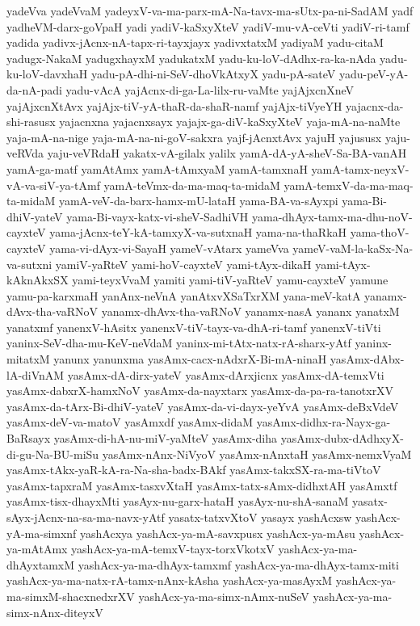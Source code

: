 {yadeVva
yadeVvaM
yadeyxV-va-ma-parx-mA-Na-tavx-ma-sUtx-pa-ni-SadAM
yadf
yadheVM-darx-goVpaH
yadi
yadiV-kaSxyXteV
yadiV-mu-vA-ceVti
yadiV-ri-tamf
yadida
yadivx-jAcnx-nA-tapx-ri-tayxjayx
yadivxtatxM
yadiyaM
yadu-citaM
yadugx-NakaM
yadugxhayxM
yadukatxM
yadu-ku-loV-dAdhx-ra-ka-nAda
yadu-ku-loV-davxhaH
yadu-pA-dhi-ni-SeV-dhoVkAtxyX
yadu-pA-sateV
yadu-peV-yA-da-nA-padi
yadu-vAcA
yajAcnx-di-ga-La-lilx-ru-vaMte
yajAjxcnXneV
yajAjxcnXtAvx
yajAjx-tiV-yA-thaR-da-shaR-namf
yajAjx-tiVyeYH
yajacnx-da-shi-rasusx
yajacnxna
yajacnxsayx
yajajx-ga-diV-kaSxyXteV
yaja-mA-na-naMte
yaja-mA-na-nige
yaja-mA-na-ni-goV-sakxra
yajf-jAcnxtAvx
yajuH
yajususx
yaju-veRVda
yaju-veVRdaH
yakatx-vA-gilalx
yalilx
yamA-dA-yA-sheV-Sa-BA-vanAH
yamA-ga-matf
yamAtAmx
yamA-tAmxyaM
yamA-tamxnaH
yamA-tamx-neyxV-vA-va-siV-ya-tAmf
yamA-teVmx-da-ma-maq-ta-midaM
yamA-temxV-da-ma-maq-ta-midaM
yamA-veV-da-barx-hamx-mU-lataH
yama-BA-va-sAyxpi
yama-Bi-dhiV-yateV
yama-Bi-vayx-katx-vi-sheV-SadhiVH
yama-dhAyx-tamx-ma-dhu-noV-cayxteV
yama-jAcnx-teY-kA-tamxyX-va-sutxnaH
yama-na-thaRkaH
yama-thoV-cayxteV
yama-vi-dAyx-vi-SayaH
yameV-vAtarx
yameVva
yameV-vaM-la-kaSx-Na-va-sutxni
yamiV-yaRteV
yami-hoV-cayxteV
yami-tAyx-dikaH
yami-tAyx-kAknAkxSX
yami-teyxVvaM
yamiti
yami-tiV-yaRteV
yamu-cayxteV
yamune
yamu-pa-karxmaH
yanAnx-neVnA
yanAtxvXSaTxrXM
yana-meV-katA
yanamx-dAvx-tha-vaRNoV
yanamx-dhAvx-tha-vaRNoV
yanamx-nasA
yananx
yanatxM
yanatxmf
yanenxV-hAsitx
yanenxV-tiV-tayx-va-dhA-ri-tamf
yanenxV-tiVti
yaninx-SeV-dha-mu-KeV-neVdaM
yaninx-mi-tAtx-natx-rA-sharx-yAtf
yaninx-mitatxM
yanunx
yanunxma
yasAmx-cacx-nAdxrX-Bi-mA-ninaH
yasAmx-dAbx-lA-diVnAM
yasAmx-dA-dirx-yateV
yasAmx-dArxjicnx
yasAmx-dA-temxVti
yasAmx-dabxrX-hamxNoV
yasAmx-da-nayxtarx
yasAmx-da-pa-ra-tanotxrXV
yasAmx-da-tArx-Bi-dhiV-yateV
yasAmx-da-vi-dayx-yeYvA
yasAmx-deBxVdeV
yasAmx-deV-va-matoV
yasAmxdf
yasAmx-didaM
yasAmx-didhx-ra-Nayx-ga-BaRsayx
yasAmx-di-hA-nu-miV-yaMteV
yasAmx-diha
yasAmx-dubx-dAdhxyX-di-gu-Na-BU-miSu
yasAmx-nAnx-NiVyoV
yasAmx-nAnxtaH
yasAmx-nemxVyaM
yasAmx-tAkx-yaR-kA-ra-Na-sha-badx-BAkf
yasAmx-takxSX-ra-ma-tiVtoV
yasAmx-tapxraM
yasAmx-tasxvXtaH
yasAmx-tatx-sAmx-didhxtAH
yasAmxtf
yasAmx-tisx-dhayxMti
yasAyx-nu-garx-hataH
yasAyx-nu-shA-sanaM
yasatx-sAyx-jAcnx-na-sa-ma-navx-yAtf
yasatx-tatxvXtoV
yasayx
yashAcxsw
yashAcx-yA-ma-simxnf
yashAcxya
yashAcx-ya-mA-savxpusx
yashAcx-ya-mAsu
yashAcx-ya-mAtAmx
yashAcx-ya-mA-temxV-tayx-torxVkotxV
yashAcx-ya-ma-dhAyxtamxM
yashAcx-ya-ma-dhAyx-tamxmf
yashAcx-ya-ma-dhAyx-tamx-miti
yashAcx-ya-ma-natx-rA-tamx-nAnx-kAsha
yashAcx-ya-masAyxM
yashAcx-ya-ma-simxM-shacxnedxrXV
yashAcx-ya-ma-simx-nAmx-nuSeV
yashAcx-ya-ma-simx-nAnx-diteyxV
}
